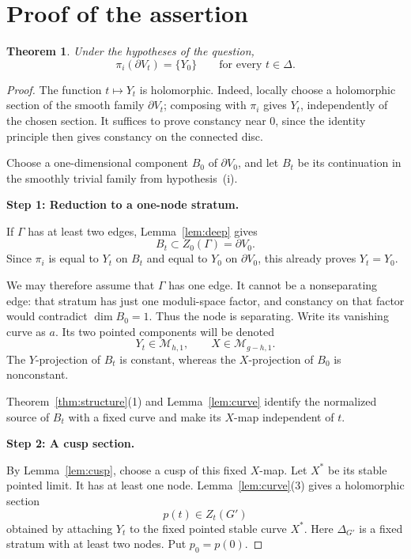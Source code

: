 \documentclass[11pt]{article}
\newcommand{\M}{\mathcal M}
\newcommand{\D}{\Delta}
\newtheorem{theorem}{Theorem}[section]
\theoremstyle{remark}
\begin{document}
\section{Proof of the assertion}

\begin{theorem}\label{thm:main}
Under the hypotheses of the question,
\[
\pi_i(\partial V_t)=\{Y_0\}
\qquad\text{for every }t\in\D.
\]
\end{theorem}

\begin{proof}
The function \(t\mapsto Y_t\) is holomorphic. Indeed, locally
choose a holomorphic section of the smooth family
\(\partial V_t\); composing with \(\pi_i\) gives \(Y_t\),
independently of the chosen section. It suffices to prove
constancy near \(0\), since the identity principle then gives
constancy on the connected disc.

Choose a one-dimensional component \(B_0\) of
\(\partial V_0\), and let \(B_t\) be its continuation in the
smoothly trivial family from hypothesis~(i).

\medskip
\noindent\textbf{Step 1: Reduction to a one-node stratum.}

If \(\Gamma\) has at least two edges,
Lemma~\ref{lem:deep} gives
\[
B_t\subset Z_0(\Gamma)=\partial V_0.
\]
Since \(\pi_i\) is equal to \(Y_t\) on \(B_t\) and equal to
\(Y_0\) on \(\partial V_0\), this already proves \(Y_t=Y_0\).

We may therefore assume that \(\Gamma\) has one edge.
It cannot be a nonseparating edge: that stratum has just one
moduli-space factor, and constancy on that factor would
contradict \(\dim B_0=1\). Thus the node is separating.
Write its vanishing curve as \(a\). Its two pointed components
will be denoted
\[
Y_t\in\M_{h,1},
\qquad
X\in\M_{g-h,1}.
\]\review{It should be $X\subseteq\M_{g-h,1}$ instead of $X\in\M_{g-h,1}$.}
The \(Y\)-projection of \(B_t\) is constant, whereas the
\(X\)-projection of \(B_0\) is nonconstant.

Theorem~\ref{thm:structure}(1) and
Lemma~\ref{lem:curve} identify the normalized source of \(B_t\)
with a fixed curve and make its \(X\)-map independent of \(t\).

\medskip
\noindent\textbf{Step 2: A cusp section.}

By Lemma~\ref{lem:cusp}, choose a cusp of this fixed
\(X\)-map. Let \(X^\ast\) be its stable pointed limit.
It has at least one node. Lemma~\ref{lem:curve}(3) gives a
holomorphic section
\[
p(t)\in Z_t(G')
\]
obtained by attaching \(Y_t\) to the fixed pointed stable curve
\(X^\ast\). Here \(\Delta_{G'}\) is a fixed stratum with at least
two nodes. Put \(p_0=p(0)\).


\end{proof}
\end{document}
